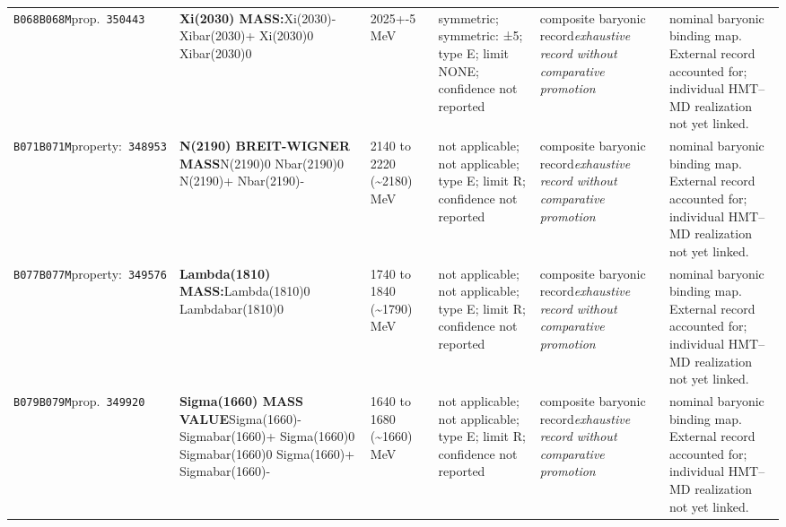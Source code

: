 \begin{landscape}
\begin{longtable}{L{1.85cm}L{4.45cm}L{2.35cm}L{4.05cm}L{3.35cm}L{7.15cm}}
\texttt{B068}\newline \texttt{B068M}\newline prop.\ \texttt{350443} & \textbf{Xi(2030) MASS:}\newline Xi(2030)- \textbar{}\allowbreak{} Xibar(2030)+ \textbar{}\allowbreak{} Xi(2030)0 \textbar{}\allowbreak{} Xibar(2030)0 & 2025+-5\,MeV & symmetric; symmetric: ±5; type E; limit NONE; confidence not reported & composite baryonic record\newline \emph{exhaustive record without comparative promotion} & nominal baryonic binding map. External record accounted for; individual HMT--MD realization not yet linked. \\
\texttt{B071}\newline \texttt{B071M}\newline property:\ \texttt{348953} & \textbf{N(2190) BREIT-WIGNER MASS}\newline N(2190)0 \textbar{}\allowbreak{} Nbar(2190)0 \textbar{}\allowbreak{} N(2190)+ \textbar{}\allowbreak{} Nbar(2190)- & 2140 to 2220 (\textasciitilde{}2180)\,MeV & not applicable; not applicable; type E; limit R; confidence not reported & composite baryonic record\newline \emph{exhaustive record without comparative promotion} & nominal baryonic binding map. External record accounted for; individual HMT--MD realization not yet linked. \\
\texttt{B077}\newline \texttt{B077M}\newline property:\ \texttt{349576} & \textbf{Lambda(1810) MASS:}\newline Lambda(1810)0 \textbar{}\allowbreak{} Lambdabar(1810)0 & 1740 to 1840 (\textasciitilde{}1790)\,MeV & not applicable; not applicable; type E; limit R; confidence not reported & composite baryonic record\newline \emph{exhaustive record without comparative promotion} & nominal baryonic binding map. External record accounted for; individual HMT--MD realization not yet linked. \\
\texttt{B079}\newline \texttt{B079M}\newline prop.\ \texttt{349920} & \textbf{Sigma(1660) MASS VALUE}\newline Sigma(1660)- \textbar{}\allowbreak{} Sigmabar(1660)+ \textbar{}\allowbreak{} Sigma(1660)0 \textbar{}\allowbreak{} Sigmabar(1660)0 \textbar{}\allowbreak{} Sigma(1660)+ \textbar{}\allowbreak{} Sigmabar(1660)- & 1640 to 1680 (\textasciitilde{}1660)\,MeV & not applicable; not applicable; type E; limit R; confidence not reported & composite baryonic record\newline \emph{exhaustive record without comparative promotion} & nominal baryonic binding map. External record accounted for; individual HMT--MD realization not yet linked. \\

\end{longtable}
\end{landscape}

